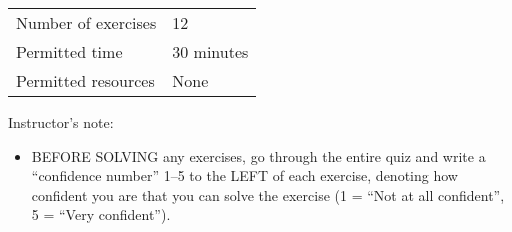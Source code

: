 \begin{center}
\begin{tabular}{l@{ : }l}
Number of exercises	&	12			\\
Permitted time		&	30 minutes	\\
Permitted resources	&	None
\end{tabular}
\end{center}
\vspace{.25in}
\noindent{}Instructor's note:
\begin{itemize}
\item BEFORE SOLVING any exercises, go through the entire quiz and write a ``confidence number'' 1--5 to the LEFT of each exercise, denoting how confident you are that you can solve the exercise (1 = ``Not at all confident'', 5 = ``Very confident'').
\end{itemize}